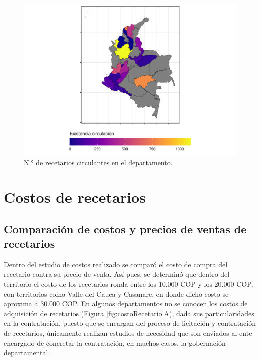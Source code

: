 \documentclass[
]{book}
\begin{document}
\begin{figure}

{\centering \includegraphics[width=0.85\linewidth]{InformeFinal_files/figure-latex/existenciasRecetarios2-1} 

}

\caption{N.° de recetarios circulantes en el departamento.}\label{fig:existenciasRecetarios2}
\end{figure}

\hypertarget{costos-de-recetarios}{%
\section{Costos de recetarios}\label{costos-de-recetarios}}


\hypertarget{comparaciuxf3n-de-costos-y-precios-de-ventas-de-recetarios}{%
\subsection{Comparación de costos y precios de ventas de recetarios}\label{comparaciuxf3n-de-costos-y-precios-de-ventas-de-recetarios}}

Dentro del estudio de costos realizado se comparó el costo de compra del recetario contra su precio de venta. Así pues, se determinó que dentro del territorio el costo de los recetarios ronda entre los 10.000 COP y los 20.000 COP, con territorios como Valle del Cauca y Casanare, en donde dicho costo se aproxima a 30.000 COP. En algunos departamentos no se conocen los costos de adquisición de recetarios (Figura \ref{fig:costoRecetario}A), dada sus particularidades en la contratación, puesto que se encargan del proceso de licitación y contratación de recetarios, únicamente realizan estudios de necesidad que son enviados al ente encargado de concretar la contratación, en muchos casos, la gobernación departamental.
\end{document}
